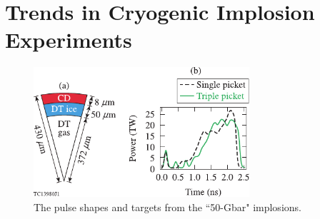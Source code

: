 \documentclass[aip,reprint]{revtex4-1}
\begin{document}
\section{Trends in Cryogenic Implosion Experiments}
\label{sec:Exp_trends}
%
%
%
%
\begin{figure}
\includegraphics[width=80mm]{Fig1_Bose}
\caption{\label{fig:Exp_pulse_target} The pulse shapes and targets from the ``50-Gbar" implosions.\cite{Exp_Regan}}
\end{figure}
%
%
%
%
\end{document}
